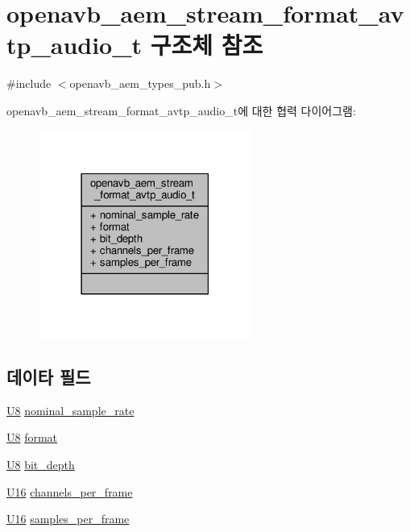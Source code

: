 \hypertarget{structopenavb__aem__stream__format__avtp__audio__t}{}\section{openavb\+\_\+aem\+\_\+stream\+\_\+format\+\_\+avtp\+\_\+audio\+\_\+t 구조체 참조}
\label{structopenavb__aem__stream__format__avtp__audio__t}


{\ttfamily \#include $<$openavb\+\_\+aem\+\_\+types\+\_\+pub.\+h$>$}



openavb\+\_\+aem\+\_\+stream\+\_\+format\+\_\+avtp\+\_\+audio\+\_\+t에 대한 협력 다이어그램\+:
\nopagebreak
\begin{figure}[H]
\begin{center}
\leavevmode
\includegraphics[width=198pt]{structopenavb__aem__stream__format__avtp__audio__t__coll__graph}
\end{center}
\end{figure}
\subsection*{데이타 필드}
\begin{DoxyCompactItemize}
\item 
\hyperlink{openavb__types__base__pub_8h_aa63ef7b996d5487ce35a5a66601f3e73}{U8} \hyperlink{structopenavb__aem__stream__format__avtp__audio__t_a0334ec8bb89451be357e518fac47c6e3}{nominal\+\_\+sample\+\_\+rate}
\item 
\hyperlink{openavb__types__base__pub_8h_aa63ef7b996d5487ce35a5a66601f3e73}{U8} \hyperlink{structopenavb__aem__stream__format__avtp__audio__t_a37f3210787a8b11a8f8811f7cf167fdf}{format}
\item 
\hyperlink{openavb__types__base__pub_8h_aa63ef7b996d5487ce35a5a66601f3e73}{U8} \hyperlink{structopenavb__aem__stream__format__avtp__audio__t_a59be32cc200d31dd3136bb9bdc8b9819}{bit\+\_\+depth}
\item 
\hyperlink{openavb__types__base__pub_8h_a0a0a322d5fa4a546d293a77ba8b4a71f}{U16} \hyperlink{structopenavb__aem__stream__format__avtp__audio__t_a22109d51bf0853f5a15da16a22ff763b}{channels\+\_\+per\+\_\+frame}
\item 
\hyperlink{openavb__types__base__pub_8h_a0a0a322d5fa4a546d293a77ba8b4a71f}{U16} \hyperlink{structopenavb__aem__stream__format__avtp__audio__t_ad1e55e1a786a746f7d7f18a3028c8432}{samples\+\_\+per\+\_\+frame}
\end{DoxyCompactItemize}


